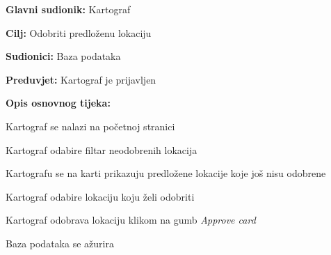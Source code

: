 					\noindent {}
					\begin{packed_item}
	
						\item \textbf{Glavni sudionik: }Kartograf
						\item  \textbf{Cilj:} Odobriti predloženu lokaciju
						\item  \textbf{Sudionici:} Baza podataka
						\item  \textbf{Preduvjet:} Kartograf je prijavljen
						\item  \textbf{Opis osnovnog tijeka:}
						
						\item[] \begin{packed_enum}
	
							\item Kartograf se nalazi na početnoj stranici
							\item Kartograf odabire filtar neodobrenih lokacija
							\item Kartografu se na karti prikazuju predložene lokacije koje još nisu odobrene
							\item Kartograf odabire lokaciju koju želi odobriti
							\item Kartograf odobrava lokaciju klikom na gumb \textit{Approve card}
							\item Baza podataka se ažurira

						\end{packed_enum}
						
					\end{packed_item}
					\pagebreak
					
